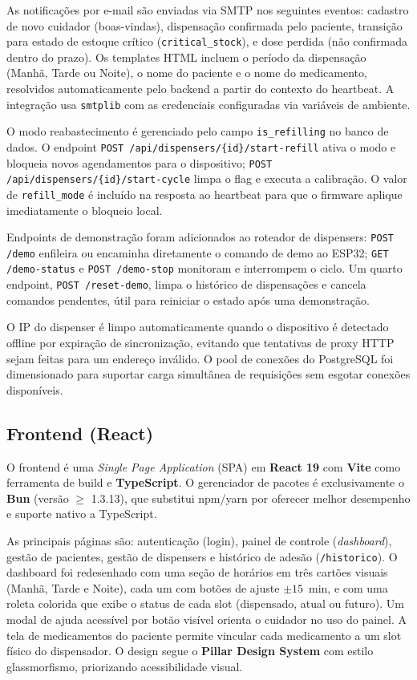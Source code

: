 \documentclass[12pt,a4paper]{article}
\begin{document}
As notificações por e-mail são enviadas via SMTP nos seguintes eventos: cadastro de novo cuidador (boas-vindas), dispensação confirmada pelo paciente, transição para estado de estoque crítico (\texttt{critical\_stock}), e dose perdida (não confirmada dentro do prazo). Os templates HTML incluem o período da dispensação (Manhã, Tarde ou Noite), o nome do paciente e o nome do medicamento, resolvidos automaticamente pelo backend a partir do contexto do heartbeat. A integração usa \texttt{smtplib} com as credenciais configuradas via variáveis de ambiente.

O modo reabastecimento é gerenciado pelo campo \texttt{is\_refilling} no banco de dados. O endpoint \texttt{POST /api/dis\-pen\-sers/\{id\}/start-refill} ativa o modo e bloqueia novos agendamentos para o dispositivo; \texttt{POST /api/dispensers/\{id\}/start-cycle} limpa o flag e executa a calibração. O valor de \texttt{refill\_mode} é incluído na resposta ao heartbeat para que o firmware aplique imediatamente o bloqueio local.

Endpoints de demonstração foram adicionados ao roteador de dispensers: \texttt{POST /demo} enfileira ou encaminha diretamente o comando de demo ao ESP32; \texttt{GET /demo-status} e \texttt{POST /demo-stop} monitoram e interrompem o ciclo. Um quarto endpoint, \texttt{POST /reset-demo}, limpa o histórico de dispensações e cancela comandos pendentes, útil para reiniciar o estado após uma demonstração.

O IP do dispenser é limpo automaticamente quando o dispositivo é detectado offline por expiração de sincronização, evitando que tentativas de proxy HTTP sejam feitas para um endereço inválido. O pool de conexões do PostgreSQL foi dimensionado para suportar carga simultânea de requisições sem esgotar conexões disponíveis.

\subsection{Frontend (React)}

O frontend é uma \emph{Single Page Application} (SPA) em \textbf{React 19} com \textbf{Vite} como ferramenta de build e \textbf{TypeScript}. O gerenciador de pacotes é exclusivamente o \textbf{Bun} (versão $\geq$ 1.3.13), que substitui npm/yarn por oferecer melhor desempenho e suporte nativo a TypeScript.

As principais páginas são: autenticação (login), painel de controle (\emph{dashboard}), gestão de pacientes, gestão de dispensers e histórico de adesão (\texttt{/historico}). O dashboard foi redesenhado com uma seção de horários em três cartões visuais (Manhã, Tarde e Noite), cada um com botões de ajuste $\pm15$~min, e com uma roleta colorida que exibe o status de cada slot (dispensado, atual ou futuro). Um modal de ajuda acessível por botão visível orienta o cuidador no uso do painel. A tela de medicamentos do paciente permite vincular cada medicamento a um slot físico do dispensador. O design segue o \textbf{Pillar Design System} com estilo glassmorfismo, priorizando acessibilidade visual.
\end{document}

